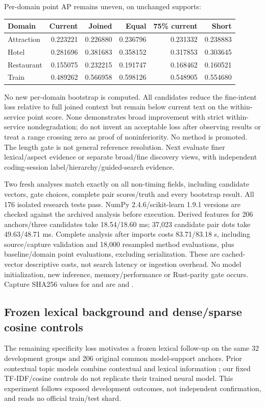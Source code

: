 \documentclass[11pt]{article}
\begin{document}
Per-domain point AP remains uneven, on unchanged supports:
\begin{center}
\begin{tabular}{lrrrrr}
\toprule
Domain & Current & Joined & Equal & 75\% current & Short \\
\midrule
Attraction & 0.223221 & 0.226880 & 0.236796 & 0.231332 & 0.238883 \\
Hotel & 0.281696 & 0.381683 & 0.358152 & 0.317853 & 0.303645 \\
Restaurant & 0.155075 & 0.232215 & 0.191747 & 0.168462 & 0.160521 \\
Train & 0.489262 & 0.566958 & 0.598126 & 0.548905 & 0.554680 \\
\bottomrule
\end{tabular}
\end{center}
No new per-domain bootstrap is computed. All candidates reduce the fine-intent
loss relative to full joined context but remain below current text on the
within-service point score. None demonstrates broad improvement with strict
within-service nondegradation; do not invent an acceptable loss after observing
results or treat a range crossing zero as proof of noninferiority.
No method is promoted. The length gate is not general reference resolution.
Next evaluate finer lexical/aspect evidence or separate broad/fine discovery
views, with independent coding-session label/hierarchy/guided-search evidence.

Two fresh analyses match exactly on all non-timing fields, including candidate
vectors, gate choices, complete pair scores/truth and every bootstrap result.
All 176 isolated research tests pass. NumPy 2.4.6/scikit-learn 1.9.1 versions
are checked against the archived analysis before execution. Derived features
for 206 anchors/three candidates take 18.54/18.60 ms; 37,023 candidate pair dots
take 49.63/48.71 ms. Complete analysis after imports costs 83.71/83.18 s,
including source/capture validation and 18,000 resampled method evaluations,
plus baseline/domain point evaluations, excluding serialization. These are
cached-vector descriptive costs, not search latency or ingestion overhead.
No model initialization, new inference, memory/performance or Rust-parity
gate occurs. Capture SHA256 values for  and
 are
and .

\subsection{Frozen lexical background and dense/sparse cosine controls}
The remaining specificity loss motivates a frozen lexical follow-up on the same
32 development groups and 206 original common model-support anchors. Prior
contextual topic models combine contextual and lexical information
\cite{contextualtopics}; our fixed TF-IDF/cosine controls do not replicate their
trained neural model. This experiment follows exposed development outcomes,
not independent confirmation, and reads no official train/test shard.
\end{document}
